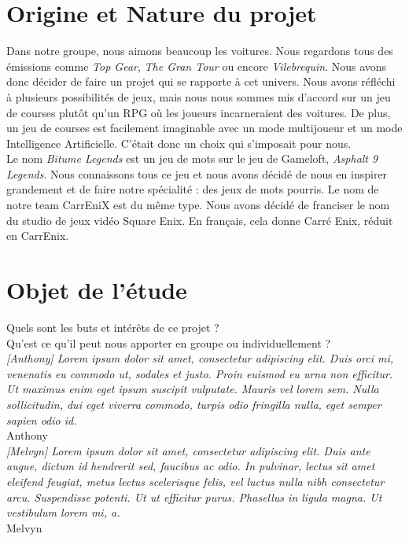 \documentclass[11pt,a4paper]{article}
\begin{document}
\clearpage

\section{Origine et Nature du projet}
  Dans notre groupe, nous aimons beaucoup les voitures. Nous regardons tous des émissions comme 
  \textit{Top Gear}, \textit{The Gran Tour} ou encore \textit{Vilebrequin}. Nous avons donc décider de faire
  un projet qui se rapporte à cet univers. Nous avons réfléchi à plusieurs possibilités de jeux, mais nous
  nous sommes mis d'accord sur un jeu de courses plutôt qu'un RPG où les joueurs incarneraient des voitures.
  De plus, un jeu de courses est facilement imaginable avec un mode multijoueur et un mode Intelligence 
  Artificielle. C'était donc un choix qui s'imposait pour nous.\\
  \indent Le nom \textit{Bitume Legends} est un jeu de mots sur le jeu de Gameloft, \textit{Asphalt 9 Legends}.
  Nous connaissons tous ce jeu et nous avons décidé de nous en inspirer grandement et de faire notre 
  spécialité : des jeux de mots pourris. Le nom de notre team CarrEniX est du même type. Nous avons décidé
  de franciser le nom du studio de jeux vidéo Square Enix. En français, cela donne Carré Enix, réduit en
  CarrEnix.
\clearpage

\section{Objet de l'étude}
  Quels sont les buts et intérêts de ce projet ?\\

  Qu'est ce qu'il peut nous apporter en groupe ou individuellement ?\\

  \textit{[Anthony] Lorem ipsum dolor sit amet, consectetur adipiscing elit. Duis orci mi, venenatis eu commodo ut, sodales et justo. Proin euismod eu urna non efficitur. Ut maximus enim eget ipsum suscipit vulputate. Mauris vel lorem sem. Nulla sollicitudin, dui eget viverra commodo, turpis odio fringilla nulla, eget semper sapien odio id.}\\
  \indent Anthony\\

  \textit{[Melvyn] Lorem ipsum dolor sit amet, consectetur adipiscing elit. Duis ante augue, dictum id hendrerit sed, faucibus ac odio. In pulvinar, lectus sit amet eleifend feugiat, metus lectus scelerisque felis, vel luctus nulla nibh consectetur arcu. Suspendisse potenti. Ut ut efficitur purus. Phasellus in ligula magna. Ut vestibulum lorem mi, a.}\\
  \indent Melvyn\\
\end{document}
